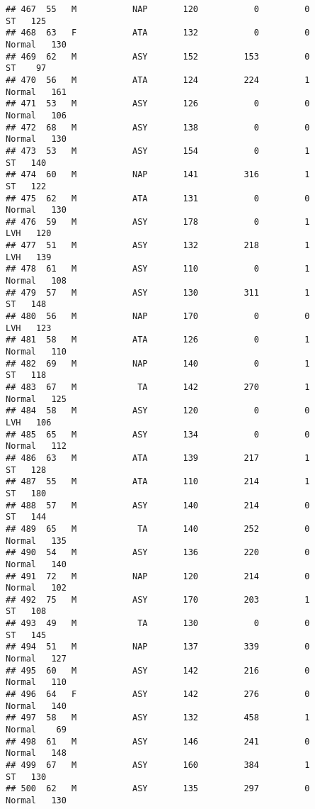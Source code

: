 \documentclass[
]{article}
\begin{document}
\begin{verbatim}
## 467  55   M           NAP       120           0         0         ST   125
## 468  63   F           ATA       132           0         0     Normal   130
## 469  62   M           ASY       152         153         0         ST    97
## 470  56   M           ATA       124         224         1     Normal   161
## 471  53   M           ASY       126           0         0     Normal   106
## 472  68   M           ASY       138           0         0     Normal   130
## 473  53   M           ASY       154           0         1         ST   140
## 474  60   M           NAP       141         316         1         ST   122
## 475  62   M           ATA       131           0         0     Normal   130
## 476  59   M           ASY       178           0         1        LVH   120
## 477  51   M           ASY       132         218         1        LVH   139
## 478  61   M           ASY       110           0         1     Normal   108
## 479  57   M           ASY       130         311         1         ST   148
## 480  56   M           NAP       170           0         0        LVH   123
## 481  58   M           ATA       126           0         1     Normal   110
## 482  69   M           NAP       140           0         1         ST   118
## 483  67   M            TA       142         270         1     Normal   125
## 484  58   M           ASY       120           0         0        LVH   106
## 485  65   M           ASY       134           0         0     Normal   112
## 486  63   M           ATA       139         217         1         ST   128
## 487  55   M           ATA       110         214         1         ST   180
## 488  57   M           ASY       140         214         0         ST   144
## 489  65   M            TA       140         252         0     Normal   135
## 490  54   M           ASY       136         220         0     Normal   140
## 491  72   M           NAP       120         214         0     Normal   102
## 492  75   M           ASY       170         203         1         ST   108
## 493  49   M            TA       130           0         0         ST   145
## 494  51   M           NAP       137         339         0     Normal   127
## 495  60   M           ASY       142         216         0     Normal   110
## 496  64   F           ASY       142         276         0     Normal   140
## 497  58   M           ASY       132         458         1     Normal    69
## 498  61   M           ASY       146         241         0     Normal   148
## 499  67   M           ASY       160         384         1         ST   130
## 500  62   M           ASY       135         297         0     Normal   130

\end{verbatim}
\end{document}
